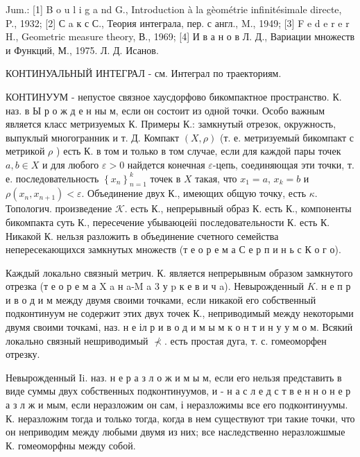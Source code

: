 \documentclass[10pt]{article}
\begin{document}
Jum.: [1] B o u l i g a nd G., Introduction à la gèométrie infinitésimale directe, P., 1932; [2] С a к с С., Теория интеграла, пер. с англ., M., 1949; [3] F e d e r e r H., Geometric measure theory, В., 1969; [4] И в а н о в Л. Д., Вариации множеств и Функций, М., 1975. Л. Д. Исанов.



КОНТИНУАЛЬНЫЙ ИНТЕГРАЛ - см. Интеграл по траекториям.



КОНТИНУУМ - непустое связное хаусдорфово бикомпактное пространство. К. наз. в Ы р о ж д е н ны м, если он состоит из одной точки. Особо важным является класс метризуемых К. Примеры К.: замкнутый отрезок, окружность, выпуклый многогранник и т. Д. Компакт $(X, \rho)$ (т. е. метризуемыӥ бикомпакт с метрикой $\rho$ ) есть $К$. в том и только в том случае, если для каждой пары точек $a, b \in X$ и для любого $\varepsilon>0$ найдется конечная $\varepsilon$-цепь, соединяющая эти точки, т. е. последовательность $\left\{x_{n}\right\}_{n=1}^{k}$ точек в $X$ такая, что $x_{1}=a$, $x_{k}=b$ и $\rho\left(x_{n}, x_{n+1}\right)<\varepsilon$. Объединение двух К., имеющих общую точку, есть $\kappa$. Топологич. произведение $\mathcal{K}$. есть К., непрерывный образ К. есть К., компоненты бикомпакта суть К., пересечение убываюцеӥі последовательности К. есть К. Никакой К. нельзя разложить в объединение счетного семейства непересекающихся замкнутых множеств (т е о р е м а С е р п и н ь с К $о$ г о).



Каждый локально связныӥ метрич. К. является непрерывным образом замкнутого отрезка (т е о р е м а X a н a-M a 3 у p к е в и ч a). Невырожденный $K$. н е п р и в о д и м между двумя своими точками, если никакой его собственный подконтинуум не содержит этих двух точек К., неприводимый между некоторыми двумя своими точкамі, наз. н е іл р и в о д и м ы м к о н т и н у у м о м. Всякиӥ локально связный нешриводимый $\nprec$. есть простая дуга, т. с. гомеоморфен отрезку.



Невырожденный Ii. наз. н е р а з л о ж и м ы м, если его нельзя представить в виде суммы двух собственных подконтинуумов, и - н а с л е д с т в е н н о н е р а з л ж и мым, если неразложим он сам, і неразложимы все его подконтинуумы. К. неразложнм тогда и только тогда, когда в нем существуют три такие точки, что он неприводим между любыми двумя из них; все наследственно неразложшмые К. гомеоморфны между собой.
\end{document}
